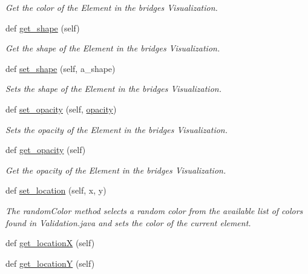 \begin{DoxyCompactItemize}
\begin{DoxyCompactList}\small\item\em Get the color of the Element in the bridges Visualization. \end{DoxyCompactList}\item 
def \mbox{\hyperlink{classbridges_1_1element__visualizer_1_1_element_visualizer_a7f4d717fbc741c23069f87cf01a93019}{get\+\_\+shape}} (self)
\begin{DoxyCompactList}\small\item\em Get the shape of the Element in the bridges Visualization. \end{DoxyCompactList}\item 
def \mbox{\hyperlink{classbridges_1_1element__visualizer_1_1_element_visualizer_a3c299b071e967781c75009325813cdb1}{set\+\_\+shape}} (self, a\+\_\+shape)
\begin{DoxyCompactList}\small\item\em Sets the shape of the Element in the bridges Visualization. \end{DoxyCompactList}\item 
def \mbox{\hyperlink{classbridges_1_1element__visualizer_1_1_element_visualizer_a2d29661b16e53fa3c9f9fa7aba20c8a0}{set\+\_\+opacity}} (self, \mbox{\hyperlink{classbridges_1_1element__visualizer_1_1_element_visualizer_add8eebf4bece910f0d6899fedd71b139}{opacity}})
\begin{DoxyCompactList}\small\item\em Sets the opacity of the Element in the bridges Visualization. \end{DoxyCompactList}\item 
def \mbox{\hyperlink{classbridges_1_1element__visualizer_1_1_element_visualizer_ad2c89b3d7666c7c121425a86dcb2e713}{get\+\_\+opacity}} (self)
\begin{DoxyCompactList}\small\item\em Get the opacity of the Element in the bridges Visualization. \end{DoxyCompactList}\item 
def \mbox{\hyperlink{classbridges_1_1element__visualizer_1_1_element_visualizer_a7aef4402f2de7e88a3260bbec3a708a7}{set\+\_\+location}} (self, x, y)
\begin{DoxyCompactList}\small\item\em The random\+Color method selects a random color from the available list of colors found in Validation.\+java and sets the color of the current element. \end{DoxyCompactList}\item 
def \mbox{\hyperlink{classbridges_1_1element__visualizer_1_1_element_visualizer_a421fed895be9c1b52f373a2e41fb47e2}{get\+\_\+locationX}} (self)
\item 
def \mbox{\hyperlink{classbridges_1_1element__visualizer_1_1_element_visualizer_ae3667a299f795f3a618a9c8a461fd548}{get\+\_\+locationY}} (self)
\end{DoxyCompactItemize}
